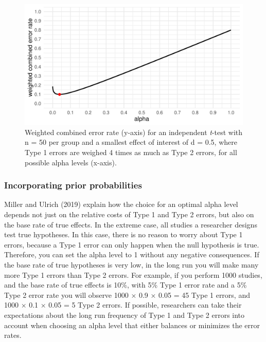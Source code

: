 \documentclass[
  english,
  ,jou,floatsintext]{apa6}
\begin{document}
\begin{figure}
\centering
\includegraphics{Justify_in_Practice_files/figure-latex/cost-plot-1.pdf}
\caption{\label{fig:cost-plot}Weighted combined error rate (y-axis) for an independent \emph{t}-test with n = 50 per group and a smallest effect of interest of d = 0.5, where Type 1 errors are weighed 4 times as much as Type 2 errors, for all possible alpha levels (x-axis).}
\end{figure}

\hypertarget{incorporating-prior-probabilities}{%
\subsubsection{Incorporating prior probabilities}\label{incorporating-prior-probabilities}}

Miller and Ulrich (2019) explain how the choice for an optimal alpha level depends not just on the relative costs of Type 1 and Type 2 errors, but also on the base rate of true effects. In the extreme case, all studies a researcher designs test true hypotheses. In this case, there is no reason to worry about Type 1 errors, because a Type 1 error can only happen when the null hypothesis is true. Therefore, you can set the alpha level to 1 without any negative consequences. If the base rate of true hypotheses is very low, in the long run you will make many more Type 1 errors than Type 2 errors. For example, if you perform 1000 studies, and the base rate of true effects is 10\%, with 5\% Type 1 error rate and a 5\% Type 2 error rate you will observe 1000 × 0.9 × 0.05 = 45 Type 1 errors, and 1000 × 0.1 × 0.05 = 5 Type 2 errors. If possible, researchers can take their expectations about the long run frequency of Type 1 and Type 2 errors into account when choosing an alpha level that either balances or minimizes the error rates.
\end{document}
